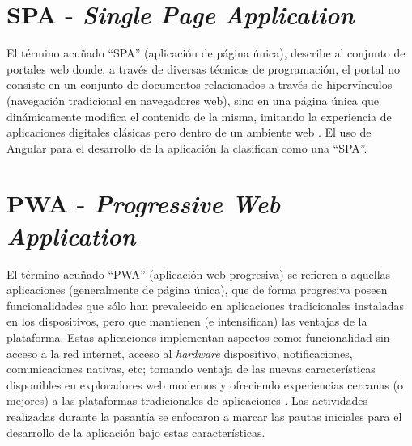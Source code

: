 \section{SPA - \textit{Single Page Application}}

El término acuñado ``SPA'' (aplicación de página única), describe al conjunto de portales web donde, a través de diversas técnicas de programación, el portal no consiste en un conjunto de documentos relacionados a través de hipervínculos (navegación tradicional en navegadores web), sino en una página única que dinámicamente modifica el contenido de la misma, imitando la experiencia de aplicaciones digitales clásicas pero dentro de un ambiente web \cite{spa}. El uso de Angular para el desarrollo de la aplicación la clasifican como una ``SPA''.

\section{PWA - \textit{Progressive Web Application}}

El término acuñado ``PWA'' (aplicación web progresiva) se refieren a aquellas aplicaciones (generalmente de página única), que de forma progresiva poseen funcionalidades que sólo han prevalecido en aplicaciones tradicionales instaladas en los dispositivos, pero que mantienen (e intensifican) las ventajas de la plataforma. Estas aplicaciones implementan aspectos como: funcionalidad sin acceso a la red internet, acceso al \textit{hardware} dispositivo, notificaciones, comunicaciones nativas, etc; tomando ventaja de las nuevas características disponibles en exploradores web modernos y ofreciendo experiencias cercanas (o mejores) a las plataformas tradicionales de aplicaciones \cite{pwa}. Las actividades realizadas durante la pasantía se enfocaron a marcar las pautas iniciales para el desarrollo de la aplicación bajo estas características.
